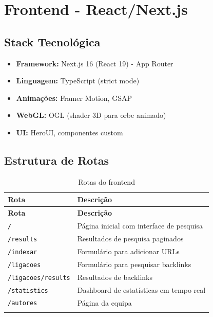 \documentclass[12pt,a4paper]{article}
\begin{document}
\newpage

\section{Frontend - React/Next.js}

\subsection{Stack Tecnológica}

\begin{itemize}
    \item \textbf{Framework:} Next.js 16 (React 19) - App Router
    \item \textbf{Linguagem:} TypeScript (strict mode)
    \item \textbf{Animações:} Framer Motion, GSAP
    \item \textbf{WebGL:} OGL (shader 3D para orbe animado)
    \item \textbf{UI:} HeroUI, componentes custom
\end{itemize}

\subsection{Estrutura de Rotas}

\begin{longtable}{|p{4cm}|p{9cm}|}
\hline
\textbf{Rota} & \textbf{Descrição} \\
\hline
\endfirsthead
\hline
\textbf{Rota} & \textbf{Descrição} \\
\hline
\endhead
\hline
\endfoot

\texttt{/} & Página inicial com interface de pesquisa \\
\texttt{/results} & Resultados de pesquisa paginados \\
\texttt{/indexar} & Formulário para adicionar URLs \\
\texttt{/ligacoes} & Formulário para pesquisar backlinks \\
\texttt{/ligacoes/results} & Resultados de backlinks \\
\texttt{/statistics} & Dashboard de estatísticas em tempo real \\
\texttt{/autores} & Página da equipa \\
\hline
\caption{Rotas do frontend}
\end{longtable}
\end{document}
